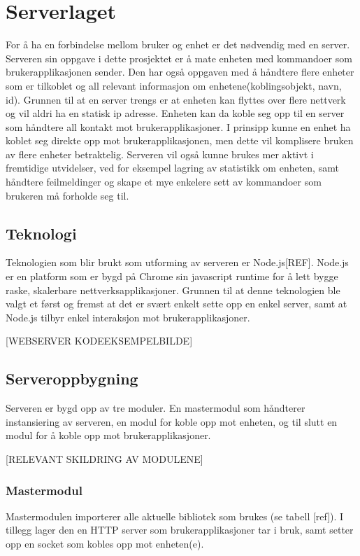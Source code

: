 \documentclass[12pt]{report}
\begin{document}
\clearpage

\chapter{Serverlaget}
For å ha en forbindelse mellom bruker og enhet er det nødvendig med en server. Serveren sin oppgave i dette prosjektet er å mate enheten med kommandoer som brukerapplikasjonen sender. Den har også oppgaven med å håndtere flere enheter som er tilkoblet og all relevant informasjon om enhetene(koblingsobjekt, navn, id). Grunnen til at en server trengs er at enheten kan flyttes over flere nettverk og vil aldri ha en statisk ip adresse. Enheten kan da koble seg opp til en server som håndtere all kontakt mot brukerapplikasjoner. I prinsipp kunne en enhet ha koblet seg direkte opp mot brukerapplikasjonen, men dette vil komplisere bruken av flere enheter betraktelig. Serveren vil også kunne brukes mer aktivt i fremtidige utvidelser, ved for eksempel lagring av statistikk om enheten, samt håndtere feilmeldinger og skape et mye enkelere sett av kommandoer som brukeren må forholde seg til.

\section{Teknologi}
Teknologien som blir brukt som utforming av serveren er Node.js[REF]. Node.js er en platform som er bygd på Chrome sin javascript runtime for å lett bygge raske, skalerbare nettverksapplikasjoner. Grunnen til at denne teknologien ble valgt et først og fremst at det er svært enkelt sette opp en enkel server, samt at Node.js tilbyr enkel interaksjon mot brukerapplikasjoner. 

[WEBSERVER KODEEKSEMPELBILDE]

\section{Serveroppbygning}
Serveren er bygd opp av tre moduler. En mastermodul som håndterer instansiering av serveren, en modul for koble opp mot enheten, og til slutt en modul for å koble opp mot brukerapplikasjoner. 

[RELEVANT SKILDRING AV MODULENE]

\subsection{Mastermodul}
Mastermodulen importerer alle aktuelle bibliotek som brukes (se tabell [ref]). I tillegg lager den en HTTP server som brukerapplikasjoner tar i bruk, samt setter opp en socket som kobles opp mot enheten(e).
\end{document}
